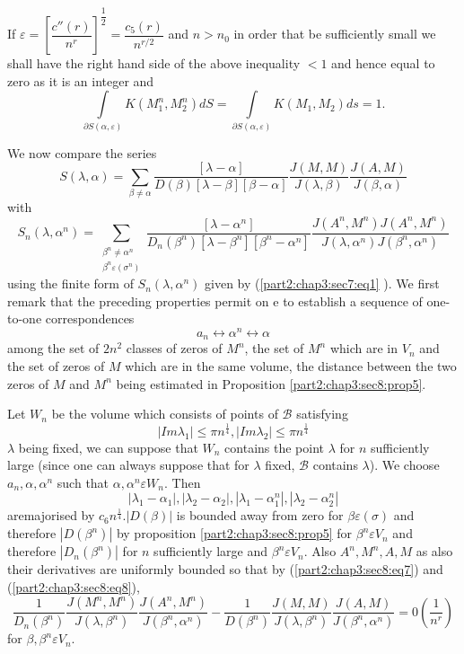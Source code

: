 If $\varepsilon = \left [ \dfrac{c'' (r)}{ n^r} \right ]^{\dfrac{1}{2}}=
\dfrac{c_5(r)}{n^{r/2}}$ and $n>n_0$ in order that be sufficiently
small we shall have the right hand side of the above inequality $<1$
and hence equal to zero as it is an integer and 
$$
\int  \limits_{\partial S(\alpha, \varepsilon )} K(M^n_1,M^n_2)dS =\int 
\limits_{\partial S(\alpha, \varepsilon )} K(M_1,M_2)ds=1. 
$$


We now compare the series
$$
S(\lambda, \alpha)=\sum_{\beta \neq \alpha}
\frac{[\lambda-\alpha]}{D(\beta)[\lambda -\beta][\beta -\alpha]}
\frac{J(M,M)}{J(\lambda, \beta)} \frac{J(A,M)}{J(\beta, \alpha)} 
$$
with\pageoriginale
$$
S_n(\lambda, \alpha^n)=\sum _{\substack {\beta ^n \neq
    \alpha^n\\{\beta ^n \varepsilon  (\sigma^n)}}}
\frac{[\lambda-\alpha^n]}{D_n(\beta^n)[\lambda -\beta^n][\beta^n
    -\alpha^n]} \frac{J(A^n,M^n)J(A^n,M^n)}{J(\lambda,
  \alpha^n)J(\beta^n, \alpha^n)} 
$$
using the finite form of $S_n(\lambda, \alpha^n)$ given by
(\ref{part2:chap3:sec7:eq1} ). We
first remark that the preceding properties permit on e to establish a
sequence of one-to-one correspondences 
$$
a_n \leftrightarrow \alpha^n \leftrightarrow \alpha
$$
among the set of $2n^2$ classes of zeros of $M^n$, the set of $M^n$
which are in $V_n$ and the set of zeros of $M$ which are in the same
volume, the distance between the two zeros of $M$ and $M^n$ being
estimated in Proposition \ref{part2:chap3:sec8:prop5}. 

Let $W_n$ be the volume which consists of points of $\mathscr{B}$  satisfying
$$
|Im \lambda_1|\leq \pi n^{\frac{1}{4}}, |Im \lambda_2|\leq \pi n^{\frac{1}{4}}
$$
$\lambda$ being fixed, we can suppose that $W_n$ contains the point
$\lambda$ for $n$ sufficiently large (since one can always suppose that
for $\lambda$ fixed, $\mathscr{B}$ contains $\lambda$). We choose
$a_n, \alpha, \alpha^n$ such that $\alpha,\alpha^n \varepsilon  W_n$. Then 
$$
|\lambda_1-\alpha_1|,|\lambda_2-\alpha_2|,|\lambda_1-\alpha_1^n|,
|\lambda_2-\alpha_2^n|  
$$
are\pageoriginale majorised by $c_6n^{\frac{1}{4}}. |D(\beta)|$ is bounded away
from zero for $\beta \varepsilon  (\sigma)$ and therefore $|D(\beta^n)|$ by
proposition \ref{part2:chap3:sec8:prop5} for $\beta ^n \varepsilon  V_n$ and therefore $|D_n(\beta^n)|$
for $n$ sufficiently large and $\beta^n \varepsilon  V_n$. Also $A^n,M^n,A,M$
as also their derivatives are uniformly bounded so that by
(\ref{part2:chap3:sec8:eq7}) and (\ref{part2:chap3:sec8:eq8}),  
$$
\frac{1}{D_n(\beta^n)}\frac{J(M^n,M^n)}{J(\lambda,
  \beta^n)}\frac{J(A^n,M^n)}{J(\beta^n, \alpha^n)}-
\frac{1}{D(\beta^n)} \frac{J(M,M)}{J(\lambda,
  \beta^n)}\frac{J(A,M)}{J(\beta^n, \alpha^n)}= 0\left(\frac{1}{n^r}\right)
$$
for  $\beta, \beta^n \varepsilon  V_n$.
 
